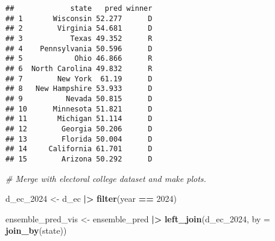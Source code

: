 \documentclass[
]{article}
\newenvironment{Shaded}{\begin{snugshade}}{\end{snugshade}}
\newcommand{\AttributeTok}[1]{\textcolor[rgb]{0.13,0.29,0.53}{#1}}
\newcommand{\CommentTok}[1]{\textcolor[rgb]{0.56,0.35,0.01}{\textit{#1}}}
\newcommand{\DecValTok}[1]{\textcolor[rgb]{0.00,0.00,0.81}{#1}}
\newcommand{\FunctionTok}[1]{\textcolor[rgb]{0.13,0.29,0.53}{\textbf{#1}}}
\newcommand{\NormalTok}[1]{#1}
\newcommand{\OtherTok}[1]{\textcolor[rgb]{0.56,0.35,0.01}{#1}}
\newcommand{\SpecialCharTok}[1]{\textcolor[rgb]{0.81,0.36,0.00}{\textbf{#1}}}
\newcommand{\StringTok}[1]{\textcolor[rgb]{0.31,0.60,0.02}{#1}}
\begin{document}
\begin{Shaded}
\end{Shaded}

\begin{verbatim}
##             state   pred winner
## 1       Wisconsin 52.277      D
## 2        Virginia 54.681      D
## 3           Texas 49.352      R
## 4    Pennsylvania 50.596      D
## 5            Ohio 46.866      R
## 6  North Carolina 49.832      R
## 7        New York  61.19      D
## 8   New Hampshire 53.933      D
## 9          Nevada 50.815      D
## 10      Minnesota 51.821      D
## 11       Michigan 51.114      D
## 12        Georgia 50.206      D
## 13        Florida 50.004      D
## 14     California 61.701      D
## 15        Arizona 50.292      D
\end{verbatim}

\begin{Shaded}
\begin{Highlighting}[]
\CommentTok{\# Merge with electoral college dataset and make plots. }
\end{Highlighting}
\end{Shaded}

\begin{Shaded}
\begin{Highlighting}[]
\NormalTok{d\_ec\_2024 }\OtherTok{\textless{}{-}}\NormalTok{ d\_ec }\SpecialCharTok{|\textgreater{}}
  \FunctionTok{filter}\NormalTok{(year }\SpecialCharTok{==} \DecValTok{2024}\NormalTok{)}

\NormalTok{ensemble\_pred\_vis }\OtherTok{\textless{}{-}}\NormalTok{ ensemble\_pred }\SpecialCharTok{|\textgreater{}}
  \FunctionTok{left\_join}\NormalTok{(d\_ec\_2024, }\AttributeTok{by =} \FunctionTok{join\_by}\NormalTok{(state))}
\end{Highlighting}
\end{Shaded}
\end{document}
